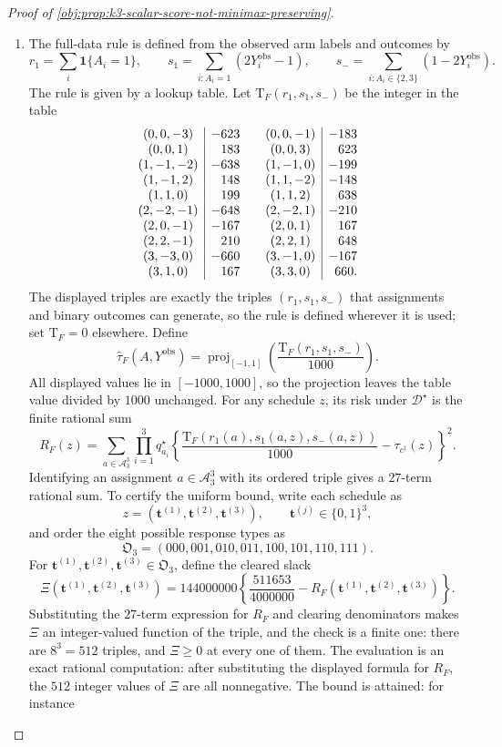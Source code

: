 \begin{proof}[Proof of \cref{obj:prop:k3-scalar-score-not-minimax-preserving}]
\begin{enumerate}
\item
The full-data rule is defined from the observed arm labels and outcomes by
\[
r_1=\sum_i\mathbf 1\{A_i=1\},\qquad
s_1=\sum_{i:A_i=1}(2Y_i^{\mathrm{obs}}-1),\qquad
s_-=\sum_{i:A_i\in\{2,3\}}(1-2Y_i^{\mathrm{obs}}).
\]
The rule is given by a lookup table.  Let \(\mathrm T_F(r_1,s_1,s_-)\) be the integer in the table
\[
\begin{array}{c|r@{\qquad}c|r}
(0,0,-3)&-623&(0,0,-1)&-183\\
(0,0,1)&183&(0,0,3)&623\\
(1,-1,-2)&-638&(1,-1,0)&-199\\
(1,-1,2)&148&(1,1,-2)&-148\\
(1,1,0)&199&(1,1,2)&638\\
(2,-2,-1)&-648&(2,-2,1)&-210\\
(2,0,-1)&-167&(2,0,1)&167\\
(2,2,-1)&210&(2,2,1)&648\\
(3,-3,0)&-660&(3,-1,0)&-167\\
(3,1,0)&167&(3,3,0)&660 .
\end{array}
\]
The displayed triples are exactly the triples \((r_1,s_1,s_-)\) that assignments and binary outcomes can generate, so the rule is defined wherever it is used; set \(\mathrm T_F=0\) elsewhere. Define
\[
\widehat\tau_F(A,Y^{\mathrm{obs}})
=
\operatorname{proj}_{[-1,1]}\!\left(\frac{\mathrm T_F(r_1,s_1,s_-)}{1000}\right).
\]
All displayed values lie in \([-1000,1000]\), so the projection leaves the table value divided by \(1000\) unchanged. For any schedule \(z\), its risk under \(\mathcal D^\star\) is the finite rational sum
\[
R_F(z)
=
\sum_{a\in\mathcal A_3^3}
\prod_{i=1}^3 q^\star_{a_i}
\left\{
\frac{\mathrm T_F(r_1(a),s_1(a,z),s_-(a,z))}{1000}
-\tau_{c^\dagger}(z)
\right\}^2 .
\]
Identifying an assignment \(a\in\mathcal A_3^3\) with its ordered triple gives a \(27\)-term rational sum. To certify the uniform bound, write each schedule as
\[
z=(\mathbf t^{(1)},\mathbf t^{(2)},\mathbf t^{(3)}),
\qquad
\mathbf t^{(j)}\in\{0,1\}^3,
\]
and order the eight possible response types as
\[
\mathfrak O_3=(000,001,010,011,100,101,110,111).
\]
For \(\mathbf t^{(1)},\mathbf t^{(2)},\mathbf t^{(3)}\in\mathfrak O_3\), define the cleared slack
\[
\Xi(\mathbf t^{(1)},\mathbf t^{(2)},\mathbf t^{(3)})
=
144000000\left\{\frac{511653}{4000000}
-R_F(\mathbf t^{(1)},\mathbf t^{(2)},\mathbf t^{(3)})\right\}.
\]
Substituting the \(27\)-term expression for \(R_F\) and clearing denominators makes \(\Xi\) an integer-valued function of the triple, and the check is a finite one: there are \(8^3=512\) triples, and \(\Xi\ge 0\) at every one of them.  The evaluation is an exact rational computation: after substituting the displayed formula for \(R_F\), the \(512\) integer values of \(\Xi\) are all nonnegative.  The bound is attained: for instance

\end{enumerate}
\end{proof}
